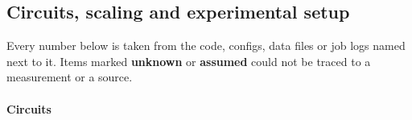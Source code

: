 \subsection*{Circuits, scaling and experimental setup}\label{sec:energy-setup}

Every number below is taken from the code, configs, data files or job logs named next to it. Items marked \textbf{unknown} or \textbf{assumed} could not be traced to a measurement or a source.

\paragraph{Circuits}

